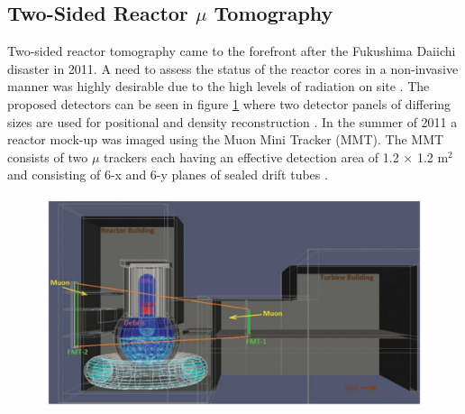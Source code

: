 \subsection{Two-Sided Reactor $\mu$ Tomography}
Two-sided reactor tomography came to the forefront after the Fukushima Daiichi disaster in 2011. A need to assess the status of the reactor cores in a non-invasive manner was highly desirable due to the high levels of radiation on site \cite{miyadera2013imaging}. The proposed detectors can be seen in figure \ref{fig:fukushimaImaging} where two detector panels of differing sizes are used for positional and density reconstruction \cite{miyadera2013imaging}. In the summer of 2011 a reactor mock-up was imaged using the Muon Mini Tracker (MMT). The MMT consists of two $\mu$ trackers each having an effective detection area of 1.2 $\times$ 1.2 m$^2$ and consisting of 6-x and 6-y planes of sealed drift tubes \cite{miyadera2013imaging}.

\begin{figure}[!h]
 \centering
 \includegraphics[width=0.7\linewidth]{Chapter5/Figs/MuTomographyExamples/fukushimaImaging.jpg}
 \label{fig:fukushimaImaging}
\end{figure}

